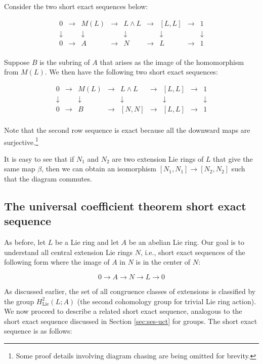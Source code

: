 \documentclass{ucetd}
\begin{document}
Consider the two short exact sequences below:

$$\begin{array}{ccccccccc}
0 & \to & M(L) & \to & L \wedge L & \to & [L,L] & \to & 1\\
\downarrow &&   \downarrow  &&  \downarrow     && \downarrow&& \downarrow\\
0 & \to & A &\to & N & \to & L & \to & 1\\
\end{array}$$

Suppose $B$ is the subring of $A$ that arises as the image of the homomorphism from $M(L)$. We then have the following two short exact sequences:

$$\begin{array}{ccccccccc}
0 & \to & M(L) & \to & L \wedge L & \to & [L,L] & \to & 1\\
\downarrow &&   \downarrow  &&  \downarrow     && \downarrow&& \downarrow\\
0 & \to & B &\to & [N,N] & \to & [L,L] & \to & 1\\
\end{array}$$

Note that the second row sequence is exact because all the downward
maps are surjective.\footnote{Some proof details involving diagram
  chasing are being omitted for brevity.}

It is easy to see that if $N_1$ and $N_2$ are two
extension Lie rings of $L$ that give the same map $\beta$, then we can
obtain an isomorphism $[N_1,N_1] \to [N_2,N_2]$ such that the diagram
commutes. %

\vspace{2in}
\subsection{The universal coefficient theorem short exact sequence}\label{sec:ses-uct-lie}

As before, let $L$ be a Lie ring and let $A$ be an abelian Lie ring. Our
goal is to understand all central extension Lie rings $N$, i.e., short
exact sequences of the following form where the image of $A$ in $N$ is
in the center of $N$:

$$0 \to A \to N \to L \to 0$$

As discussed earlier, the set of all congruence classes of extensions
is classified by the group $H^2_{\text{Lie}}(L;A)$ (the second
cohomology group for trivial Lie ring action). We now proceed to
describe a related short exact sequence, analogous to the short exact
sequence discussed in Section \ref{sec:ses-uct} for groups. The short exact
sequence is as follows:
\end{document}
